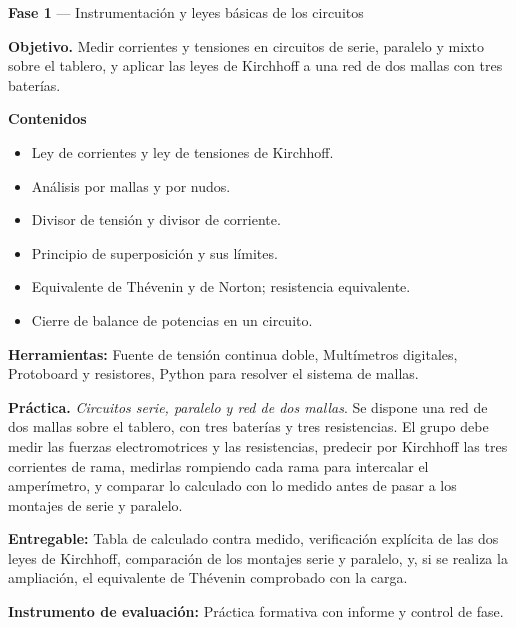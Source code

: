\documentclass[11pt,a4paper]{article}
\begin{document}
\begin{tcolorbox}[cajaContenido,title={Semana 4 --- Circuitos eléctricos y teoremas fundamentales}]
\textbf{Fase 1} --- Instrumentación y leyes básicas de los circuitos

\textbf{Objetivo.} Medir corrientes y tensiones en circuitos de serie, paralelo y mixto sobre el tablero, y aplicar las leyes de Kirchhoff a una red de dos mallas con tres baterías.

\textbf{Contenidos}

\begin{itemize}[leftmargin=1.4em,itemsep=2pt,topsep=3pt]
  \item Ley de corrientes y ley de tensiones de Kirchhoff.
  \item Análisis por mallas y por nudos.
  \item Divisor de tensión y divisor de corriente.
  \item Principio de superposición y sus límites.
  \item Equivalente de Thévenin y de Norton; resistencia equivalente.
  \item Cierre de balance de potencias en un circuito.
\end{itemize}

\textbf{Herramientas:} Fuente de tensión continua doble, Multímetros digitales, Protoboard y resistores, Python para resolver el sistema de mallas.

\textbf{Práctica.} \emph{Circuitos serie, paralelo y red de dos mallas}. Se dispone una red de dos mallas sobre el tablero, con tres baterías y tres resistencias. El grupo debe medir las fuerzas electromotrices y las resistencias, predecir por Kirchhoff las tres corrientes de rama, medirlas rompiendo cada rama para intercalar el amperímetro, y comparar lo calculado con lo medido antes de pasar a los montajes de serie y paralelo.

\textbf{Entregable:} Tabla de calculado contra medido, verificación explícita de las dos leyes de Kirchhoff, comparación de los montajes serie y paralelo, y, si se realiza la ampliación, el equivalente de Thévenin comprobado con la carga.

\textbf{Instrumento de evaluación:} Práctica formativa con informe y control de fase.
\end{tcolorbox}
\end{document}
